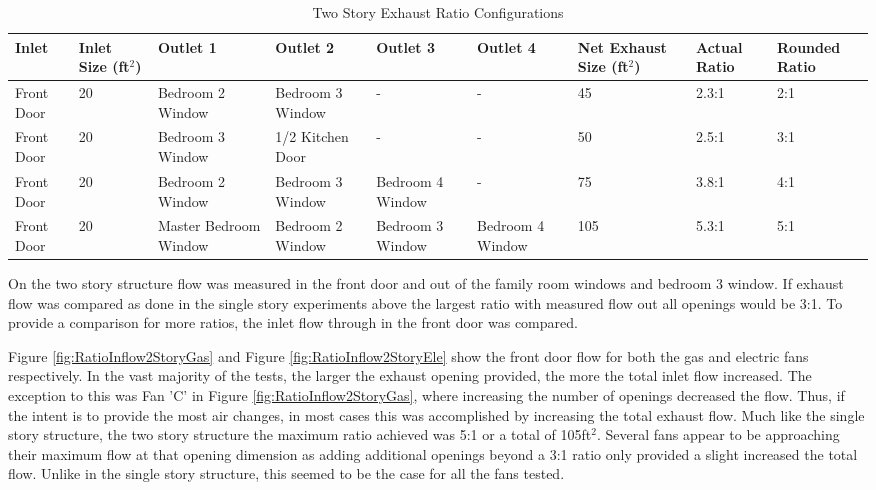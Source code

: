 \documentclass{article}
\begin{document}
\begin{table}[H]
	\centering
	\caption {Two Story Exhaust Ratio Configurations}
	\begin{tabular}{|C{.45in}|C{.6in}|C{.7in}|C{.7in}|C{.7in}|C{.7in}|C{.6in}|C{.45in}|C{.5in}|}
		\hline
		Inlet & Inlet Size (ft$^2$) & Outlet 1 & Outlet 2 & Outlet 3 & Outlet 4 & Net Exhaust Size (ft$^2$) & Actual Ratio & Rounded Ratio \\ \hline \hline
		Front Door & 20 & Bedroom 2 Window & Bedroom 3 Window & - & - & 45 & 2.3:1 & 2:1 \\ \hline
		Front Door & 20 & Bedroom 3 Window & 1/2 Kitchen Door & - & - & 50 & 2.5:1 & 3:1 \\ \hline
		Front Door & 20 & Bedroom 2 Window & Bedroom 3 Window & Bedroom 4 Window & - & 75 & 3.8:1 & 4:1 \\ \hline
		Front Door & 20 & Master Bedroom Window & Bedroom 2 Window & Bedroom 3 Window & Bedroom 4 Window & 105 & 5.3:1 & 5:1 \\ \hline
	\end{tabular}
	\label{table:RatioExhaustComp_2Story}
\end{table}

On the two story structure flow was measured in the front door and out of the family room windows and bedroom 3 window. If exhaust flow was compared as done in the single story experiments above the largest ratio with measured flow out all openings would be 3:1. To provide a comparison for more ratios, the inlet flow through in the front door was compared. 

Figure \ref{fig:RatioInflow2StoryGas} and Figure \ref{fig:RatioInflow2StoryEle} show the front door flow for both the gas and electric fans respectively. In the vast majority of the tests, the larger the exhaust opening provided, the more the total inlet flow increased. The exception to this was Fan 'C' in Figure \ref{fig:RatioInflow2StoryGas}, where increasing the number of openings decreased the flow. Thus, if the intent is to provide the most air changes, in most cases this was accomplished by increasing the total exhaust flow. Much like the single story structure, the two story structure the maximum ratio achieved was 5:1 or a total of 105ft$^2$. Several fans appear to be approaching their maximum flow at that opening dimension as adding additional openings beyond a 3:1 ratio only provided a slight increased the total flow. Unlike in the single story structure, this seemed to be the case for all the fans tested. 
\end{document}

